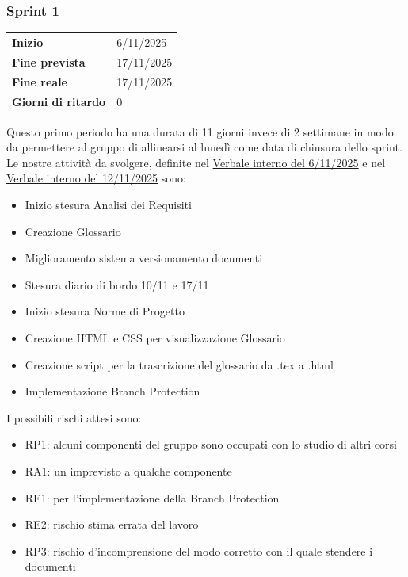 \subsubsection{Sprint 1}


\begin{tabular}{p{} p{}}
	\textbf{Inizio} & 6/11/2025 \\
	\textbf{Fine prevista} & 17/11/2025 \\
	\textbf{Fine reale} & 17/11/2025 \\
	\textbf{Giorni di ritardo} & 0
\end{tabular}
\newline \newline
Questo primo periodo ha una durata di 11 giorni invece di 2 settimane in modo da permettere al gruppo di allinearsi al lunedì come data di chiusura dello sprint.\\
Le nostre attività da svolgere, definite nel \href{https://nullpointersgroup.github.io/Documentazione/output/RTB/Verbali%20Interni/2025-11-06_verbale_interno.pdf}{Verbale interno del 6/11/2025} e nel \href{https://nullpointersgroup.github.io/Documentazione/output/RTB/Verbali%20Interni/2025-11-12_verbale_interno.pdf}{Verbale interno del 12/11/2025} sono:
\begin{itemize}[itemsep=5pt, parsep=1pt, label=$\scriptstyle\bullet$]
	\item Inizio stesura Analisi dei Requisiti
	\item Creazione Glossario
	\item Miglioramento sistema versionamento documenti
	\item Stesura diario di bordo 10/11 e 17/11
	\item Inizio stesura Norme di Progetto
	\item Creazione HTML e CSS per visualizzazione Glossario
	\item Creazione script per la trascrizione del glossario da .tex a .html
	\item Implementazione Branch Protection
\end{itemize}


I possibili rischi attesi sono:
\begin{itemize}[itemsep=5pt, parsep=1pt, label=$\scriptstyle\bullet$]
	\item RP1: alcuni componenti del gruppo sono occupati con lo studio di altri corsi
	\item RA1: un imprevisto a qualche componente
	\item RE1: per l'implementazione della Branch Protection
	\item RE2: rischio stima errata del lavoro
	\item RP3: rischio d'incomprensione del modo corretto con il quale stendere i documenti
\end{itemize}

